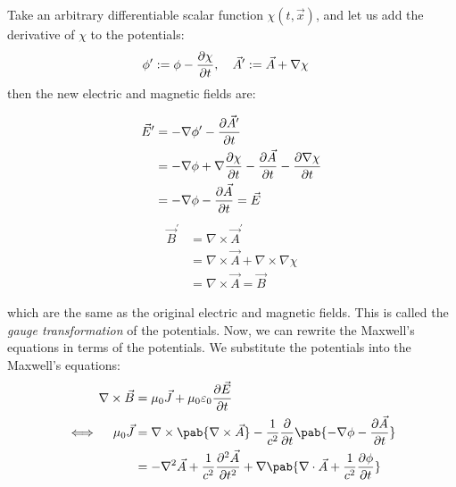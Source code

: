 Take an arbitrary differentiable scalar function $\chi(t, \vec{x})$, and let us add the derivative of $\chi$ to the potentials:
\begin{align}
  \phi^\prime & := \phi - \pdv{\chi}{t}, \quad
  \vec{A}^\prime := \vec{A} + \nabla \chi
\end{align}
then the new electric and magnetic fields are:
\begin{multicols}{2}
  \vspace*{-4em}
  \begin{align}
    \vec{E}^\prime & = -\nabla \phi^\prime - \pdv{\vec{A}^\prime}{t}                                  \\
                   & = - \nabla \phi + \nabla \pdv{\chi}{t} - \pdv{\vec{A}}{t} - \pdv{\nabla \chi}{t} \\
                   & = - \nabla \phi - \pdv{\vec{A}}{t} = \vec{E}
  \end{align}
  \begin{align}
    \vec{B}^\prime & = \nabla \times \vec{A}^\prime                      \\
                   & = \nabla \times \vec{A} + \nabla \times \nabla \chi \\
                   & = \nabla \times \vec{A} = \vec{B}
  \end{align}
\end{multicols}
which are the same as the original electric and magnetic fields.
This is called the \emph{gauge transformation} of the potentials.
Now, we can rewrite the Maxwell's equations in terms of the potentials.
We substitute the potentials into the Maxwell's equations:
\begin{align}
  \nabla \times \vec{B}   & = \mu_0 \vec{J}+ \mu_0 \varepsilon_0 \pdv{\vec{E}}{t}                                                                      \\
  \iff\quad \mu_0 \vec{J} & =  \nabla \times \pab{\nabla \times \vec{A}} - \frac{1}{c^2} \pdv{}{t} \pab{- \nabla \phi - \pdv{\vec{A}}{t}}              \\
                          & = - \nabla^2 \vec{A} + \frac{1}{c^2}\pdv[2]{\vec{A}}{t} +  \nabla \pab{\nabla \cdot \vec{A} + \frac{1}{c^2} \pdv{\phi}{t}}
\end{align}
